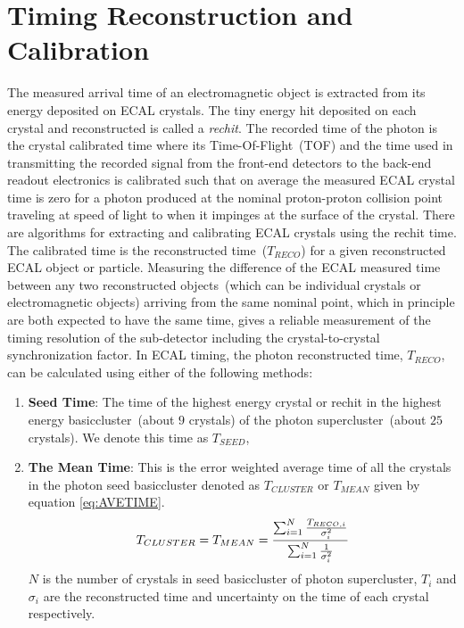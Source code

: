 \chapter{Timing Reconstruction and Calibration}
The measured arrival time of an electromagnetic object is extracted from its energy deposited on ECAL crystals. The tiny energy hit deposited on each crystal and reconstructed is called a \textit{rechit}. The recorded time of the photon is the crystal calibrated time where its Time-Of-Flight~(TOF) and the time used in transmitting the recorded signal from the front-end detectors to the back-end readout electronics is calibrated such that on average the measured ECAL crystal time is zero for a photon produced at the nominal proton-proton collision point traveling at speed of light to when it impinges at the surface of the crystal.  There are algorithms for extracting and calibrating ECAL crystals using the rechit time. The calibrated time is the reconstructed time~($T_{RECO}$) for a given reconstructed ECAL object or particle. 
Measuring the difference of the ECAL measured time between any two reconstructed objects~(which can be individual crystals or electromagnetic objects) arriving from the same nominal point, which in principle are both expected to have the same time, gives a reliable measurement of the timing resolution of the sub-detector including the crystal-to-crystal synchronization factor.  In ECAL timing, the photon reconstructed time, $T_{RECO}$, can be calculated using either of the following methods:
\begin{enumerate}
\item \textbf{Seed Time}: The time of the highest energy crystal or rechit in the highest energy basiccluster~(about $9$ crystals) of the photon supercluster~(about $25$ crystals). We  denote this time as $T_{SEED}$,
\item \textbf{The Mean Time}: This is the error weighted average time of all the crystals in the photon seed basiccluster denoted as $T_{CLUSTER}$ or $T_{MEAN}$ given by equation \ref{eq:AVETIME}.
\begin{equation}{\label{eq:AVETIME}}
T_{CLUSTER} = T_{MEAN} = \frac{\sum_{i=1}^N\frac{T_{RECO, i}}{\sigma_{i}^{2}}}{\sum_{i=1}^{N}\frac{1}{\sigma_{i}^{2}}} 
\end{equation}
\newline
 $N$ is the number of crystals in seed basiccluster of photon supercluster, $T_{i}$  and $\sigma_{i}$ are the reconstructed time and uncertainty on the time of each crystal respectively. 
\end{enumerate}

